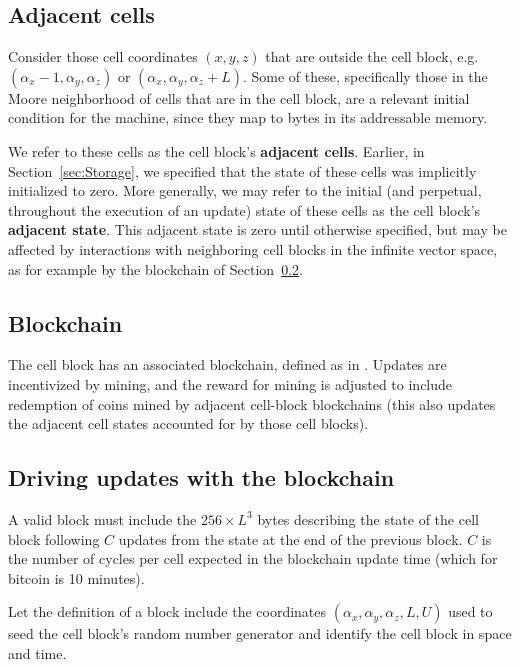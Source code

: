\documentclass{article}
\begin{document}
\subsection{Adjacent cells}
\label{sec:AdjacentCells}

Consider those cell coordinates $(x,y,z)$ that are outside the cell block,
e.g. $(\alpha_x-1,\alpha_y,\alpha_z)$ or  $(\alpha_x,\alpha_y,\alpha_z + L)$.
Some of these, specifically those in the Moore neighborhood of cells that are in the cell block,
are a relevant initial condition for the machine,
since they map to bytes in its addressable memory.

We refer to these cells as the cell block's {\bf adjacent cells}.
Earlier, in Section~\ref{sec:Storage}, we specified that the state of these cells was implicitly initialized to zero.
More generally, we may refer to the initial (and perpetual, throughout the execution of an update)
state of these cells as the cell block's {\bf adjacent state}.
This adjacent state is zero until otherwise specified, but may be affected
by interactions with neighboring cell blocks in the infinite vector space,
as for example by the blockchain of Section~\ref{sec:Blockchain}.

\subsection{Blockchain}
\label{sec:Blockchain}

The cell block has an associated blockchain, defined as in \cite{Nakamoto2008}.
Updates are incentivized by mining,
and the reward for mining is adjusted to include redemption of coins mined by adjacent cell-block blockchains
(this also updates the adjacent cell states accounted for by those cell blocks).

\subsection{Driving updates with the blockchain}

A valid block must include the $256 \times L^3$ bytes describing the state of the cell block following $C$ updates
from the state at the end of the previous block.
$C$ is the number of cycles per cell expected in the blockchain update time
(which for bitcoin is 10 minutes).

Let the definition of a block include the coordinates $(\alpha_x,\alpha_y,\alpha_z,L,U)$
used to seed the cell block's random number generator and identify the cell block in space and time.
\end{document}
